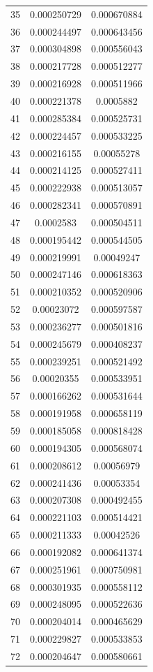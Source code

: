 \documentclass{jreport}		%
\begin{document}
\begin{table}
\begin{tabular}{c|cc}
35&0.000250729&0.000670884 \\
36&0.000244497&0.000643456 \\
37&0.000304898&0.000556043 \\
38&0.000217728&0.000512277 \\
39&0.000216928&0.000511966 \\
40&0.000221378&0.0005882 \\
41&0.000285384&0.000525731 \\
42&0.000224457&0.000533225 \\
43&0.000216155&0.00055278 \\
44&0.000214125&0.000527411 \\
45&0.000222938&0.000513057 \\
46&0.000282341&0.000570891 \\
47&0.0002583&0.000504511 \\
48&0.000195442&0.000544505 \\
49&0.000219991&0.00049247 \\
50&0.000247146&0.000618363 \\
51&0.000210352&0.000520906 \\
52&0.00023072&0.000597587 \\
53&0.000236277&0.000501816 \\
54&0.000245679&0.000408237 \\
55&0.000239251&0.000521492 \\
56&0.00020355&0.000533951 \\
57&0.000166262&0.000531644 \\
58&0.000191958&0.000658119 \\
59&0.000185058&0.000818428 \\
60&0.000194305&0.000568074 \\
61&0.000208612&0.00056979 \\
62&0.000241436&0.00053354 \\
63&0.000207308&0.000492455 \\
64&0.000221103&0.000514421 \\
65&0.000211333&0.00042526 \\
66&0.000192082&0.000641374 \\
67&0.000251961&0.000750981 \\
68&0.000301935&0.000558112 \\
69&0.000248095&0.000522636 \\
70&0.000204014&0.000465629 \\
71&0.000229827&0.000533853 \\
72&0.000204647&0.000580661 \\

\end{tabular}
\end{table}
\end{document}
